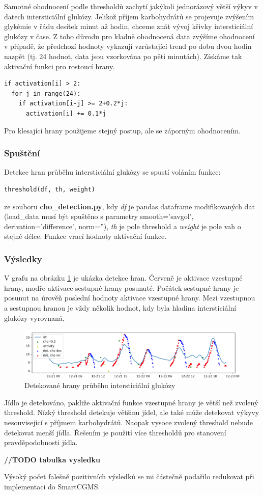 Samotné ohodnocení podle thresholdů zachytí jakýkoli jednorázový větší výkyv v datech intersticiální glukózy. Jelikož příjem karbohydrátů se projevuje zvýšením glykémie v řádu desítek minut až hodin, chceme znát vývoj křivky intersticiální glukózy v čase. Z toho důvodu pro kladně ohodnocená data zvýšíme ohodnocení v případě, že předchozí hodnoty vykazují vzrůstající trend po dobu dvou hodin nazpět (tj. 24 hodnot, data jsou vzorkována po pěti minutách). Získáme tak aktivační funkci pro rostoucí hrany.
\begin{verbatim}
if activation[i] > 2:
  for j in range(24):
    if activation[i-j] >= 2+0.2*j:
      activation[i] += 0.1*j
\end{verbatim}
Pro klesající hrany použijeme stejný postup, ale se záporným ohodnocením.

\subsubsection{Spuštění}

Detekce hran průběhu intersticiální glukózy se spustí voláním funkce:
\begin{verbatim}
threshold(df, th, weight)
\end{verbatim}
ze souboru \textbf{cho\_detection.py}, kdy \textit{df} je pandas dataframe modifikovaných dat (load\_data musí být spuštěno s parametry smooth='savgol', derivation='difference', norm=''), \textit{th} je pole threshold a \textit{weight} je pole vah o stejné délce. Funkce vrací hodnoty aktivační funkce.

\subsubsection{Výsledky}
V grafu na obrázku \ref{fig:hrany} je ukázka detekce hran. Červeně je aktivace vzestupné hrany, modře aktivace sestupné hrany posunuté. Počátek sestupné hrany je posunut na úrověň poslední hodnoty aktivace vzestupné hrany. Mezi vzestupnou a sestupnou hranou je vždy několik hodnot, kdy byla hladina intersticiální glukózy vyrovnaná.

\begin{figure}[H]
\caption{Detekované hrany průběhu intersticiální glukózy}
\label{fig:hrany}
\centering
\includegraphics[width=1\textwidth]{img/cho/hrany.png}
\end{figure}

Jídlo je detekováno, pakliže aktivační funkce vzestupné hrany je větší než zvolený threshold. Nízký threshold detekuje většinu jídel, ale také může detekovat výkyvy nesouvisející s příjmem karbohydrátů. Naopak vysoce zvolený threshold nebude detekovat menší jídla. Řešením je použití více thresholdů pro stanovení pravděpodobnosti jídla.

\textbf{//TODO tabulka vysledku}

Výsoký počet falešně pozitivních výsledků se mi částečně podařilo redukovat při implementaci do SmartCGMS.